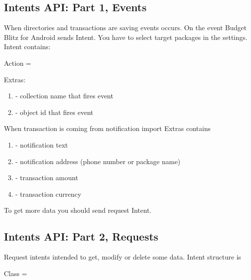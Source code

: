 \documentclass[a4paper,10pt,english]{sphinxmanual}
\begin{document}
\subsection{Intents API: Part 1, Events}
\label{\detokenize{api:intents-api-part-1-events}}
When directories and transactions are saving events occurs. On the event Budget Blitz for Android sends Intent. You have to select target
packages in the settings. Intent contains:

Action = 

Extras:
\begin{enumerate}
\def\theenumi{\arabic{enumi}}
\def\labelenumi{\theenumi .}
\makeatletter\def\p@enumii{\p@enumi \theenumi .}\makeatother
\item {} 
 - collection name that fires event

\item {} 
 - object id that fires event

\end{enumerate}

When transaction is coming from notification import Extras contains
\begin{enumerate}
\def\theenumi{\arabic{enumi}}
\def\labelenumi{\theenumi .}
\makeatletter\def\p@enumii{\p@enumi \theenumi .}\makeatother
\item {} 
 - notification text

\item {} 
 - notification address (phone number or package name)

\item {} 
 - transaction amount

\item {} 
 - transaction currency

\end{enumerate}

To get more data you should send request Intent.


\subsection{Intents API: Part 2, Requests}
\label{\detokenize{api:intents-api-part-2-requests}}
Request intents intended to get, modify or delete some data. Intent structure is

Class = 
\end{document}
